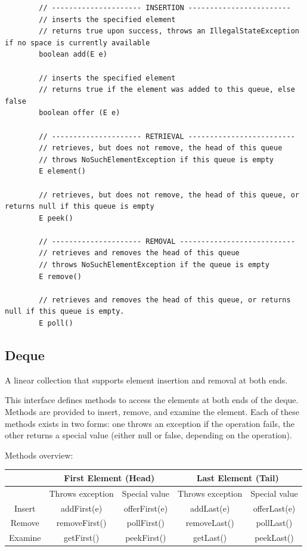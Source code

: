 \documentclass{scrartcl}
\begin{document}
    \bigskip

    \begin{lstlisting}
        // --------------------- INSERTION ------------------------
        // inserts the specified element
        // returns true upon success, throws an IllegalStateException if no space is currently available
        boolean add(E e)

        // inserts the specified element
        // returns true if the element was added to this queue, else false
        boolean offer (E e)

        // --------------------- RETRIEVAL -------------------------
        // retrieves, but does not remove, the head of this queue
        // throws NoSuchElementException if this queue is empty
        E element()

        // retrieves, but does not remove, the head of this queue, or returns null if this queue is empty
        E peek()

        // --------------------- REMOVAL ---------------------------
        // retrieves and removes the head of this queue
        // throws NoSuchElementException if the queue is empty
        E remove()

        // retrieves and removes the head of this queue, or returns null if this queue is empty.
        E poll()
    \end{lstlisting}

\subsection{Deque}

    A linear collection that supports element insertion and removal at both ends.

    This interface defines methods to access the elements at both ends of the deque. Methods are provided to insert, remove, and examine the element. Each of these methods exists in two forms: one throws an exception if the operation fails, the other returns a special value (either null or false, depending on the operation).

    \bigskip

    Methods overview:

    \bigskip

    \begin{tabular}{|c|c|c|c|c|}
        \hline
        &  \multicolumn{2}{c}{First Element (Head)} & \multicolumn{2}{c}{Last Element (Tail)} \\
        \hline
        & Throws exception & Special value  & Throws exception & Special value  \\
        \hline
        Insert & addFirst(e) & offerFirst(e) & addLast(e) & offerLast(e) \\
        \hline
        Remove& removeFirst() & pollFirst() & removeLast() & pollLast() \\
        \hline
        Examine& getFirst() & peekFirst() & getLast() &  peekLast()\\
        \hline
    \end{tabular}
\end{document}
